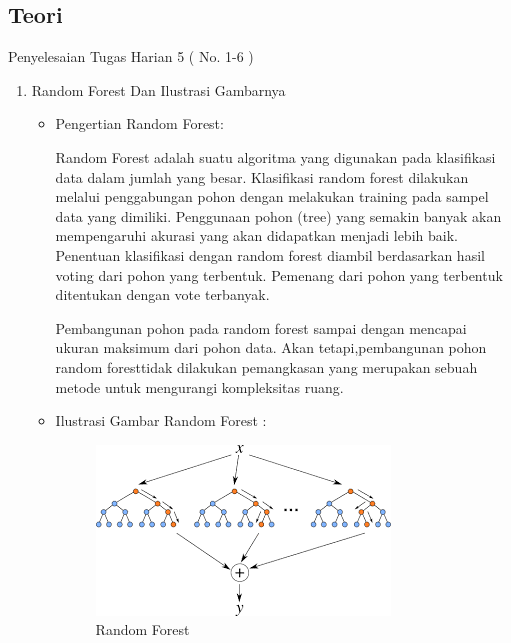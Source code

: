 \subsection{Teori}
Penyelesaian Tugas Harian 5 ( No. 1-6 )
\begin{enumerate}
\item Random Forest Dan Ilustrasi Gambarnya
\begin{itemize}
\item Pengertian Random Forest:
\par Random Forest adalah suatu algoritma yang digunakan pada klasifikasi data dalam jumlah yang besar. Klasifikasi random forest dilakukan melalui penggabungan pohon  dengan melakukan training pada sampel data yang dimiliki. Penggunaan pohon (tree) yang semakin banyak akan mempengaruhi akurasi yang akan didapatkan menjadi lebih baik. Penentuan klasifikasi dengan random forest diambil berdasarkan hasil voting dari pohon yang terbentuk. Pemenang dari pohon yang terbentuk ditentukan dengan vote terbanyak. 
\par Pembangunan pohon  pada random forest sampai dengan mencapai ukuran maksimum dari pohon data. Akan tetapi,pembangunan pohon random foresttidak dilakukan pemangkasan  yang merupakan sebuah metode untuk mengurangi kompleksitas ruang.
\item Ilustrasi Gambar Random Forest :
\par

\begin{figure}[ht]
\centering
\includegraphics[scale=0.9]{figures/aku1.png}
\caption{Random Forest}
\label{contoh}
\end{figure}

\par
\end{itemize}


\end{enumerate}
